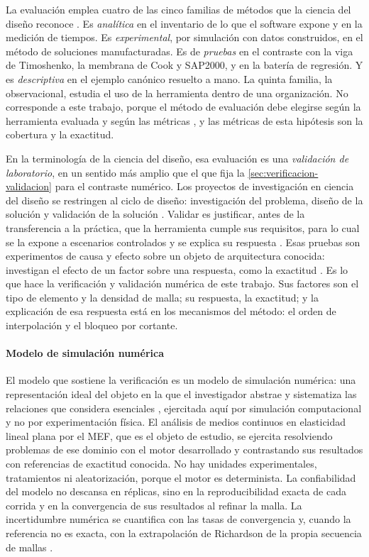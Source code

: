 La evaluación emplea cuatro de las cinco familias de métodos que la ciencia del diseño reconoce \autocite[p.~86]{hevner2004design}. Es \emph{analítica} en el inventario de lo que el software expone y en la medición de tiempos. Es \emph{experimental}, por simulación con datos construidos, en el método de soluciones manufacturadas. Es de \emph{pruebas} en el contraste con la viga de Timoshenko, la membrana de Cook y SAP2000, y en la batería de regresión. Y es \emph{descriptiva} en el ejemplo canónico resuelto a mano. La quinta familia, la observacional, estudia el uso de la herramienta dentro de una organización. No corresponde a este trabajo, porque el método de evaluación debe elegirse según la herramienta evaluada y según las métricas \autocite[p.~86]{hevner2004design}, y las métricas de esta hipótesis son la cobertura y la exactitud.

En la terminología de la ciencia del diseño, esa evaluación es una \emph{validación de laboratorio}, en un sentido más amplio que el que fija la \autoref{sec:verificacion-validacion} para el contraste numérico. Los proyectos de investigación en ciencia del diseño se restringen al ciclo de diseño: investigación del problema, diseño de la solución y validación de la solución \autocite[p.~30]{wieringa2014design}. Validar es justificar, antes de la transferencia a la práctica, que la herramienta cumple sus requisitos, para lo cual se la expone a escenarios controlados y se explica su respuesta \autocite[p.~31]{wieringa2014design}. Esas pruebas son experimentos de causa y efecto sobre un objeto de arquitectura conocida: investigan el efecto de un factor sobre una respuesta, como la exactitud \autocite[p.~247]{wieringa2014design}. Es lo que hace la verificación y validación numérica de este trabajo. Sus factores son el tipo de elemento y la densidad de malla; su respuesta, la exactitud; y la explicación de esa respuesta está en los mecanismos del método: el orden de interpolación y el bloqueo por cortante.

\paragraph{Modelo de simulación numérica} El modelo que sostiene la verificación es un modelo de simulación numérica: una representación ideal del objeto en la que el investigador abstrae y sistematiza las relaciones que considera esenciales \autocite[p.~21]{alvarez_metodologia}, ejercitada aquí por simulación computacional y no por experimentación física. El análisis de medios continuos en elasticidad lineal plana por el MEF, que es el objeto de estudio, se ejercita resolviendo problemas de ese dominio con el motor desarrollado y contrastando sus resultados con referencias de exactitud conocida. No hay unidades experimentales, tratamientos ni aleatorización, porque el motor es determinista. La confiabilidad del modelo no descansa en réplicas, sino en la reproducibilidad exacta de cada corrida y en la convergencia de sus resultados al refinar la malla. La incertidumbre numérica se cuantifica con las tasas de convergencia y, cuando la referencia no es exacta, con la extrapolación de Richardson de la propia secuencia de mallas \autocite[pp.~309-312]{oberkampf2010vv}.

